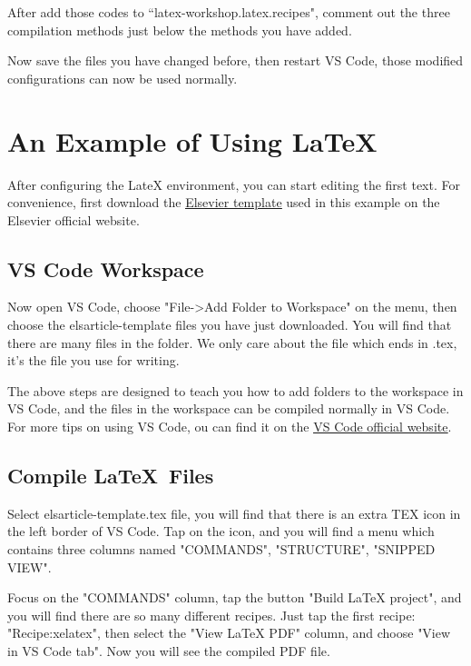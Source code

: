 \documentclass[conference]{IEEEtran}
\begin{document}
After add those codes to ``latex-workshop.latex.recipes", 
comment out the three compilation methods just below the methods you have added.

Now save the files you have changed before, 
then restart VS Code, 
those modified configurations can now be used normally.

\section{An Example of Using \LaTeX}
After configuring the LateX environment, 
you can start editing the first text. 
For convenience, 
first download the \href{https://www.elsevier.com/authors/author-schemas/latex-instructions}{\underline{Elsevier template}} used in this example on the Elsevier official website.

\subsection{VS Code Workspace}
Now open VS Code, choose "File->Add Folder to Workspace" on the menu, then choose the elsarticle-template files you have just downloaded.
You will find that there are many files in the folder. 
We only care about the file which ends in .tex, it's the file you use for writing.

The above steps are designed to teach you how to add folders to the workspace in VS Code, 
and the files in the workspace can be compiled normally in VS Code. 
For more tips on using VS Code, 
ou can find it on the \href{https://code.visualstudio.com/learn}{\underline{VS Code official website}}.

\subsection{Compile \LaTeX\ Files}
Select elsarticle-template.tex file, you will find that there is an extra TEX icon in the left border of VS Code.
Tap on the icon, and you will find a menu which contains three columns named "COMMANDS", "STRUCTURE", "SNIPPED VIEW".

Focus on the "COMMANDS" column, tap the button "Build LaTeX project", and you will find there are so many different recipes.
Just tap the first recipe: "Recipe:xelatex", then select the "View LaTeX PDF" column, and choose "View in VS Code tab".
Now you will see the compiled PDF file.




    


\end{document}
